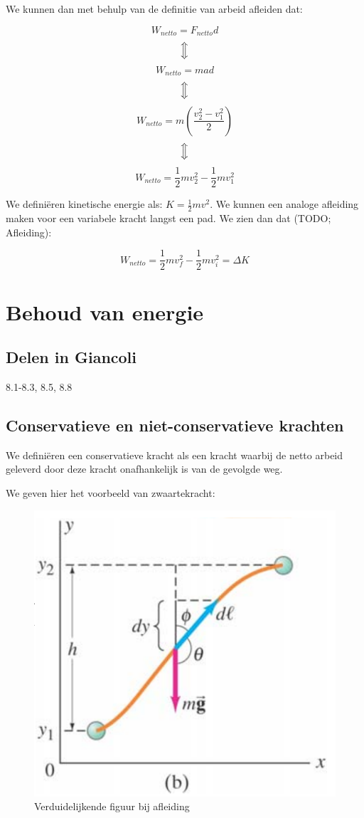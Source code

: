 \documentclass[12pt,a4paper]{article}
\newcommand{\Luda}{\Big\Updownarrow}
\begin{document}
    We kunnen dan met behulp van de definitie van arbeid afleiden dat:
    
    $$W_{netto} = F_{netto}d$$
    $$\Luda$$
    $$W_{netto} = mad$$
    $$\Luda$$
    $$W_{netto} = m\left( \frac{v_{2}^{2} - v_{1}^{2}}{2} \right)$$
    $$\Luda$$
    $$W_{netto} = \frac{1}{2} mv_{2}^{2} - \frac{1}{2} mv_{1}^{2} $$
    
    We definiëren kinetische energie als: $K = \frac{1}{2}mv^{2}$. We kunnen een analoge afleiding maken voor
    een variabele kracht langst een pad. We zien dan dat (TODO; Afleiding):
    
    $$W_{netto} = \frac{1}{2}mv_{f}^{2} - \frac{1}{2}mv_{i}^{2} = \Delta K$$
    
    \section{Behoud van energie}

    \subsection{Delen in Giancoli}
    8.1-8.3, 8.5, 8.8
    
    \subsection{Conservatieve en niet-conservatieve krachten}
    We definiëren een conservatieve kracht als een kracht waarbij de netto arbeid geleverd door deze kracht
    onafhankelijk is van de gevolgde weg. 
    
    We geven hier het voorbeeld van zwaartekracht:
    
    \begin{figure}[h]
    	\centering
	\includegraphics[width=0.6\linewidth]{zwaartekracht_conservatief}
    	\caption{Verduidelijkende figuur bij afleiding}
        	\label{zwaartekracht_conservatief}
    \end{figure}
\end{document}
